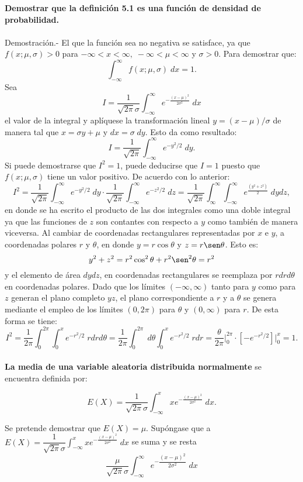 \textbf{Demostrar que la definición 5.1 es una función de densidad de probabilidad.}\\\\
    Demostración.-\; El que la función sea no negativa se satisface, ya que $f(x;\mu,\sigma)>0$ para $-\infty<x<\infty,\; -\infty<\mu<\infty$ y $\sigma>0$. Para demostrar que:
    $$\int_{-\infty}^\infty f(x;\mu,\sigma)\; dx = 1.$$
    Sea
    $$I=\dfrac{1}{\sqrt{2\pi}\sigma}\int_{-\infty}^\infty e^{-\frac{(x-\mu)^2}{2\sigma^2}}\; dx$$
    el valor de la integral y aplíquese la transformación lineal $y=(x-\mu)/\sigma$ de manera tal que $x=\sigma y + \mu$ y $dx = \sigma \; dy$. Esto da como resultado:
    $$I=\dfrac{1}{\sqrt{2\pi}}\int_{-\infty}^\infty e^{-y^2/2}\; dy.$$
    Si puede demostrarse que $I^2=1$, puede deducirse que $I=1$ puesto que $f(x;\mu,\sigma)$ tiene un valor positivo. De acuerdo con lo anterior:
    $$I^2 = \dfrac{1}{\sqrt{2\pi}} \int_{-\infty}^{\infty}e^{-y^2/2}\; dy \cdot \dfrac{1}{\sqrt{2\pi}} \int_{-\infty}^{\infty}e^{-z^2/2}\; dz = \dfrac{1}{\sqrt{2\pi}} \int_{\infty}^\infty \int_{-\infty}^\infty e^{\frac{(y^2+z^2)}{2}}\; dy dz,$$
    en donde se ha escrito el producto de las dos integrales como una doble integral ya que las funciones de $z$ son contantes con respecto a $y$ como también de manera viceversa. Al cambiar de coordenadas rectangulares representadas por $x$ e $y$, a coordenadas polares $r$ y $\theta$, en donde $y=r\cos \theta$ y $z=r\sen \theta$. Esto es:
    $$y^2+z^2 = r^2\cos^2\theta + r^2\sen^2 \theta = r^2$$
    y el elemento de área $dy dz$, en coordenadas rectangulares se reemplaza por $rd rd\theta$ en coordenadas polares. Dado que los límites $(-\infty,\infty)$ tanto para $y$ como para $z$ generan el plano completo $yz$, el plano correspondiente a $r$ y a $\theta$ se genera mediante el empleo de los límites $(0,2\pi)$ para $\theta$ y $(0,\infty)$ para $r$. De esta forma se tiene:
    $$I^2 = \dfrac{1}{2\pi}\int_0^{2\pi} \int_0^x e^{-r^2/2}\; rdrd\theta = \dfrac{1}{2\pi}\int_0^{2\pi}\;d\theta \int_0^x e^{-r^2/2}\; rdr = \dfrac{\theta}{2\pi}\bigg|_0^{2\pi}\cdot [-e^{-r^2/2}]\bigg|_0^x = 1.$$\\

    \textbf{La media de una variable aleatoria distribuida normalmente} se encuentra definida por:
\begin{tcolorbox}
    $$E(X)=\dfrac{1}{\sqrt{2\pi}\sigma} \int_{-\infty}^x x e^{-\frac{(x-\mu)^2}{2\sigma^2}}\; dx.$$
\end{tcolorbox}

Se pretende demostrar que $E(X)=\mu$. Supóngase que a $E(X)=\dfrac{1}{\sqrt{2\pi}\sigma} \int_{-\infty}^x x e^{-\frac{(x-\mu)^2}{2\sigma^2}}\; dx$ se suma y se resta
$$\dfrac{\mu}{\sqrt{2\pi}\sigma}\int_{-\infty}^\infty e^{-\dfrac{(x-\mu)^2}{2\sigma^2}}\; dx$$

